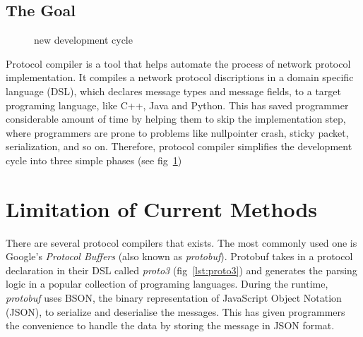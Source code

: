 \documentclass{article}
\begin{document}
\subsection{The Goal}

\begin{figure}[h!]
\begin{center}
\caption{new development cycle}
\label{fig:newDevelopmentCycle}
\end{center}
\end{figure}

Protocol compiler is a tool that helps automate the process of network protocol implementation. It compiles a network protocol discriptions in a domain specific language (DSL), which declares message types and message fields, to a target programing language, like C++, Java and Python. This has saved programmer considerable amount of time by helping them to skip the implementation step, where programmers are prone to problems like nullpointer crash, sticky packet, serialization, and so on. Therefore, protocol compiler simplifies the development cycle into three simple phases (see fig~\ref{fig:newDevelopmentCycle})




\section{Limitation of Current Methods}

There are several protocol compilers that exists. The most commonly used one is Google's \textit{Protocol Buffers} (also known as \textit{protobuf}). Protobuf takes in a protocol declaration in their DSL called \textit{proto3} (fig~\ref{lst:proto3}) and generates the parsing logic in a popular collection of programing languages. During the runtime, \textit{protobuf} uses BSON, the binary representation of JavaScript Object Notation (JSON), to serialize and deserialise the messages. This has given programmers the convenience to handle the data by storing the message in JSON format.\\
\end{document}
